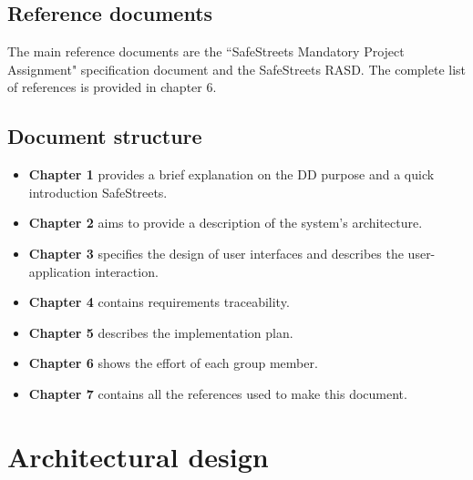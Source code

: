 \documentclass[12pt,a4paper]{report}
\begin{document}
		\section{Reference documents}
			The main reference documents are the ``SafeStreets Mandatory Project Assignment" specification document and the SafeStreets RASD. The complete list of references is provided in chapter 6.

		\section{Document structure}
			\begin{itemize}
				\item \textbf{Chapter 1} provides a brief explanation on the DD purpose and a quick introduction
					SafeStreets.
				\item \textbf{Chapter 2} aims to provide a description of the system's architecture.
				\item \textbf{Chapter 3} specifies the design of user interfaces and describes the user-application
					interaction.
				\item \textbf{Chapter 4} contains requirements traceability.
				\item \textbf{Chapter 5} describes the implementation plan.
				\item \textbf{Chapter 6} shows the effort of each group member.
				\item \textbf{Chapter 7} contains all the references used to make this document.
			\end{itemize}

	\chapter{Architectural design}
\end{document}
